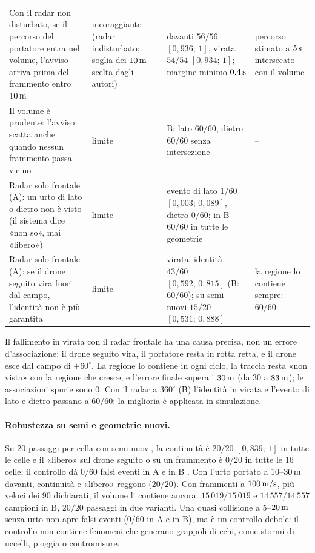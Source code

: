 \begin{table}[H]
\begin{tabularx}{\linewidth}{@{}>{\RaggedRight\arraybackslash}p{5.0cm}>{\RaggedRight\arraybackslash}p{2.0cm}>{\RaggedRight\arraybackslash}p{4.6cm}L@{}}
Con il radar non disturbato, se il percorso del portatore entra nel volume, l'avviso arriva prima del frammento entro $10\,\mathrm{m}$ & incoraggiante (radar indisturbato; soglia dei $10\,\mathrm{m}$ scelta dagli autori) & davanti $56/56$ $[0{,}936;\,1]$, virata $54/54$ $[0{,}934;\,1]$; margine minimo $0{,}4\,\mathrm{s}$ & percorso stimato a $5\,\mathrm{s}$ intersecato con il volume\\
Il volume è prudente: l'avviso scatta anche quando nessun frammento passa vicino & limite & B: lato $60/60$, dietro $60/60$ senza intersezione & --\\
Radar solo frontale (A): un urto di lato o dietro non è visto (il sistema dice «non so», mai «libero») & limite & evento di lato $1/60$ $[0{,}003;\,0{,}089]$, dietro $0/60$; in B $60/60$ in tutte le geometrie & --\\
Radar solo frontale (A): se il drone seguito vira fuori dal campo, l'identità non è più garantita & limite & virata: identità $43/60$ $[0{,}592;\,0{,}815]$ (B: $60/60$); su semi nuovi $15/20$ $[0{,}531;\,0{,}888]$ & la regione lo contiene sempre: $60/60$\\
\bottomrule
\end{tabularx}
\end{table}

Il fallimento in virata con il radar frontale ha una causa precisa, non un errore d'associazione: il drone seguito vira, il portatore resta in rotta retta, e il drone esce dal campo di $\pm60^\circ$. La regione lo contiene in ogni ciclo, la traccia resta «non vista» con la regione che cresce, e l'errore finale supera i $30\,\mathrm{m}$ (da $30$ a $83\,\mathrm{m}$); le associazioni spurie sono 0. Con il radar a $360^\circ$ (B) l'identità in virata e l'evento di lato e dietro passano a $60/60$: la miglioria è applicata in simulazione.

\paragraph{Robustezza su semi e geometrie nuovi.} Su 20 passaggi per cella con semi nuovi, la continuità è $20/20$ $[0{,}839;\,1]$ in tutte le celle e il «libero» sul drone seguito o su un frammento è $0/20$ in tutte le 16 celle; il controllo dà $0/60$ falsi eventi in A e in B . Con l'urto portato a $10$--$30\,\mathrm{m}$ davanti, continuità e «libero» reggono ($20/20$). Con frammenti a $100\,\mathrm{m/s}$, più veloci dei $90$ dichiarati, il volume li contiene ancora: $15\,019/15\,019$ e $14\,557/14\,557$ campioni in B, $20/20$ passaggi in due varianti. Una quasi collisione a $5$--$20\,\mathrm{m}$ senza urto non apre falsi eventi ($0/60$ in A e in B), ma è un controllo debole: il controllo non contiene fenomeni che generano grappoli di echi, come stormi di uccelli, pioggia o contromisure.

